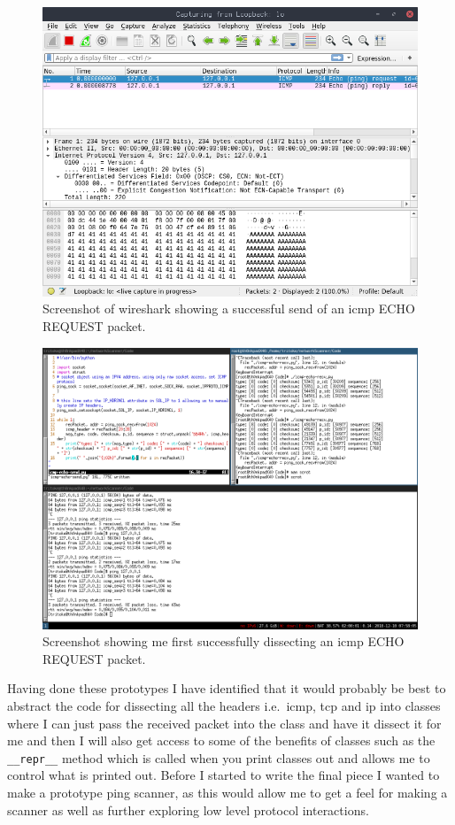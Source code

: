\documentclass[titlepage]{article}
\begin{document}
\begin{figure}[H]
  \centering
  \includegraphics[width=\textwidth]{ping_send_success.png}
  \caption{%
    Screenshot of wireshark showing a successful send of an \gls{icmp} ECHO REQUEST packet.
  }\label{pingsuccess}
\end{figure}

\begin{figure}[H]
  \centering
  \includegraphics[width=\textwidth]{local_self_ping.png}
  \caption{%
    Screenshot showing me first successfully dissecting an \gls{icmp} ECHO REQUEST packet.
  }\label{dissectsuccess}
\end{figure}

Having done these prototypes I have identified that it would probably be best to abstract the
code for dissecting all the headers i.e.\ \gls{icmp}, \gls{tcp} and \gls{ip} into classes
where I can just pass the received packet into the class and have it dissect it for me and then
I will also get access to some of the benefits of classes such as the \verb|__repr__| method
which is called when you print classes out and allows me to control what is printed out.
Before I started to write the final piece I wanted to make a prototype ping scanner, as this
would allow me to get a feel for making a scanner as well as further exploring low level protocol
interactions.
\end{document}
